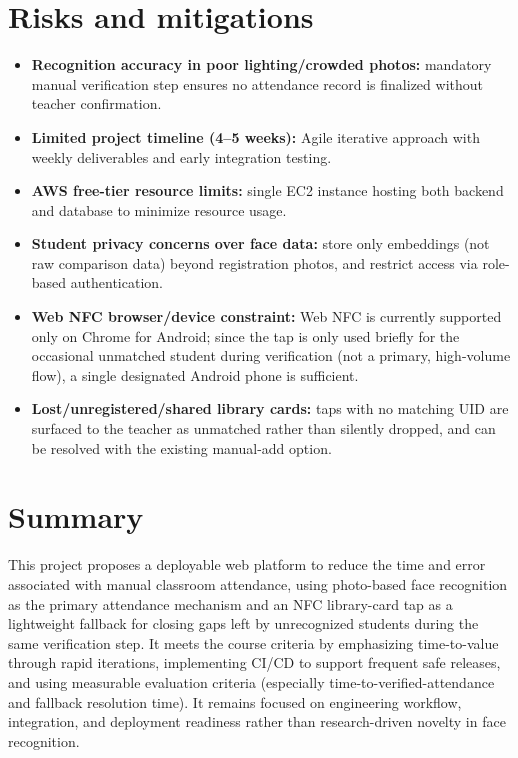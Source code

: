 \documentclass[11pt,a4paper]{article}
\begin{document}
\section{Risks and mitigations}
\begin{itemize}[leftmargin=0.7cm]
    \item \textbf{Recognition accuracy in poor lighting/crowded photos:} mandatory manual verification step ensures no attendance record is finalized without teacher confirmation.
    \item \textbf{Limited project timeline (4--5 weeks):} Agile iterative approach with weekly deliverables and early integration testing.
    \item \textbf{AWS free-tier resource limits:} single EC2 instance hosting both backend and database to minimize resource usage.
    \item \textbf{Student privacy concerns over face data:} store only embeddings (not raw comparison data) beyond registration photos, and restrict access via role-based authentication.
    \item \textbf{Web NFC browser/device constraint:} Web NFC is currently supported only on Chrome for Android; since the tap is only used briefly for the occasional unmatched student during verification (not a primary, high-volume flow), a single designated Android phone is sufficient.
    \item \textbf{Lost/unregistered/shared library cards:} taps with no matching UID are surfaced to the teacher as unmatched rather than silently dropped, and can be resolved with the existing manual-add option.
\end{itemize}

\section{Summary}
This project proposes a deployable web platform to reduce the time
and error associated with manual classroom attendance, using
photo-based face recognition as the primary attendance mechanism
and an NFC library-card tap as a lightweight fallback for closing
gaps left by unrecognized students during the same verification
step. It meets the course criteria by emphasizing time-to-value
through rapid iterations, implementing CI/CD to support frequent
safe releases, and using measurable evaluation criteria (especially
time-to-verified-attendance and fallback resolution time). It
remains focused on engineering workflow, integration, and
deployment readiness rather than research-driven novelty in face
recognition.
\end{document}
